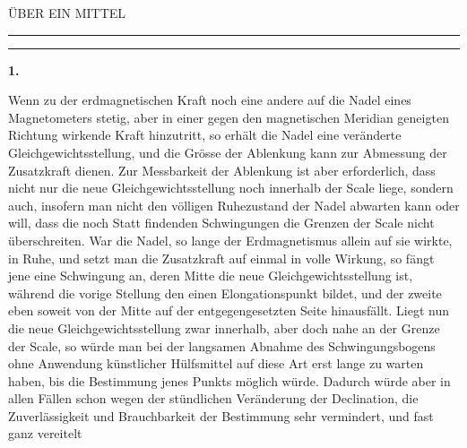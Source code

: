 \clearpage
{}
\GaussVSourceUnnumbered
{}
\vspace*{1.35in}
\begin{center}
{\small ÜBER EIN MITTEL\par}
\medskip
{}\par
\vspace{.33in}
\rule{.78\linewidth}{.35pt}\par
{}\par
\rule{.78\linewidth}{.35pt}
\end{center}
\par\medskip{}\centerline{\textbf{1.}}\nobreak\smallskip
Wenn zu der erdmagnetischen Kraft noch eine andere auf die Nadel eines Magnetometers stetig, aber in einer gegen den magnetischen Meridian geneigten Richtung wirkende Kraft hinzutritt, so erhält die Nadel eine veränderte Gleichgewichtsstellung, und die Grösse der Ablenkung kann zur Abmessung der Zusatzkraft dienen. Zur Messbarkeit der Ablenkung ist aber erforderlich, dass nicht nur die neue Gleichgewichtsstellung noch innerhalb der Scale liege, sondern auch, insofern man nicht den völligen Ruhezustand der Nadel abwarten kann oder will, dass die noch Statt findenden Schwingungen die Grenzen der Scale nicht überschreiten. War die Nadel, so lange der Erdmagnetismus allein auf sie wirkte, in Ruhe, und setzt man die Zusatzkraft auf einmal in volle Wirkung, so fängt jene eine Schwingung an, deren Mitte die neue Gleichgewichtsstellung ist, während die vorige Stellung den einen Elongationspunkt bildet, und der zweite eben soweit von der Mitte auf der entgegengesetzten Seite hinausfällt. Liegt nun die neue Gleichgewichtsstellung zwar innerhalb, aber doch nahe an der Grenze der Scale, so würde man bei der langsamen Abnahme des Schwingungsbogens ohne Anwendung künstlicher Hülfsmittel auf diese Art erst lange zu warten haben, bis die Bestimmung jenes Punkts möglich würde. Dadurch würde aber in allen Fällen schon wegen der stündlichen Veränderung der Declination, die Zuverlässigkeit und Brauchbarkeit der Bestimmung sehr vermindert, und fast ganz vereitelt
\par\GaussVSourceGathering{50\textsuperscript{*}}
